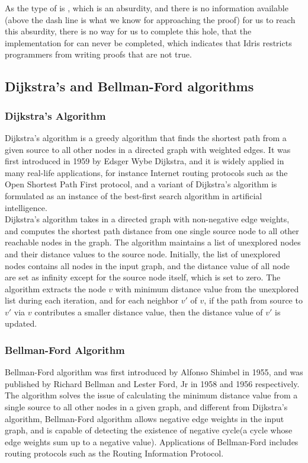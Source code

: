 As the type of  is , which is an absurdity, and there is no information available (above the dash line is what we know for approaching the proof) for us to reach this absurdity, there is no way for us to complete this hole, that the implementation for  can never be completed, which indicates that Idris restricts programmers from writing proofs that are not true. 
 
\subsection{Dijkstra's and Bellman-Ford algorithms}
\subsubsection*{Dijkstra's Algorithm}
Dijkstra's algorithm is a greedy algorithm that finds the shortest path from a given source to all other nodes in a directed graph with weighted edges. It was first introduced in 1959 by Edsger Wybe Dijkstra\cite{Dijkstras}, and it is widely applied in many real-life applications, for instance Internet routing protocols such as the Open Shortest Path First protocol, and a variant of Dijkstra's algorithm is formulated as an instance of the best-first search algorithm in artificial intelligence. 
\\

Dijkstra's algorithm takes in a directed graph with non-negative edge weights, and computes the shortest path distance from one single source node to all other reachable nodes in the graph. The algorithm maintains a list of unexplored nodes and their distance values to the source node. Initially, the list of unexplored nodes contains all nodes in the input graph, and the distance value of all node are set as infinity except for the source node itself, which is set to zero. The algorithm extracts the node $v$ with minimum distance value from the unexplored list during each iteration, and for each neighbor $v'$ of $v$, if the path from source to $v'$ via $v$ contributes a smaller distance value, then the distance value of $v'$ is updated. 

\subsubsection*{Bellman-Ford Algorithm}
Bellman-Ford algorithm was first introduced by Alfonso Shimbel in 1955\cite{Shimbel}, and was published by Richard Bellman and Lester Ford, Jr in 1958 and 1956 respectively\cite{Bellman}. The algorithm solves the issue of calculating the minimum distance value from a single source to all other nodes in a given graph, and different from Dijkstra's algorithm, Bellman-Ford algorithm allows negative edge weights in the input graph, and is capable of detecting the existence of negative cycle(a cycle whose edge weights sum up to a negative value). Applications of Bellman-Ford includes routing protocols such as the Routing Information Protocol. 
